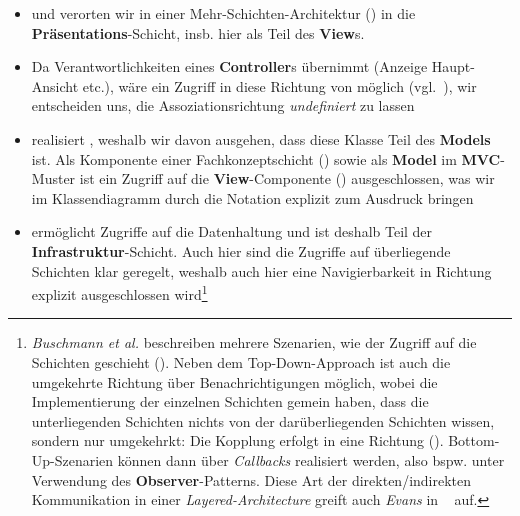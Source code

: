 \begin{itemize}
    \item {} und  verorten wir in einer Mehr-Schichten-Architektur (\cite[31 ff.]{BMRS96}) in die \textbf{Präsentations}-Schicht, insb. hier  als Teil des \textbf{View}s.
    \item[] Da  Verantwortlichkeiten eines \textbf{Controller}s übernimmt (Anzeige Haupt-Ansicht etc.), wäre ein Zugriff in diese Richtung von  möglich (vgl.~\cite[128]{BMRS96}), wir entscheiden uns, die Assoziationsrichtung \textit{undefiniert} zu lassen
    \item {} realisiert , weshalb wir davon ausgehen, dass diese Klasse Teil des \textbf{Models} ist.
    Als Komponente einer Fachkonzeptschicht (\cite[409 f.]{Bal05}) sowie als \textbf{Model} im \textbf{MVC}-Muster ist ein Zugriff auf die \textbf{View}-Componente () ausgeschlossen, was wir im Klassendiagramm durch die Notation explizit zum Ausdruck bringen
    \item {} ermöglicht Zugriffe auf die Datenhaltung und ist deshalb Teil der \textbf{Infrastruktur}-Schicht.
    Auch hier sind die Zugriffe auf überliegende Schichten klar geregelt, weshalb auch hier eine Navigierbarkeit in Richtung  explizit ausgeschlossen wird\footnote{
    \textit{Buschmann et al.} beschreiben mehrere Szenarien, wie der Zugriff auf die Schichten geschieht (\cite[36]{BMRS96}). Neben dem Top-Down-Approach ist   auch die umgekehrte Richtung über Benachrichtigungen möglich, wobei die Implementierung der einzelnen Schichten gemein haben, dass die unterliegenden Schichten nichts von der darüberliegenden Schichten wissen, sondern nur umgekehrkt: Die Kopplung erfolgt in eine Richtung  (\cite[41]{BMRS96}). Bottom-Up-Szenarien können dann über \textit{Callbacks} realisiert werden, also bspw. unter Verwendung des \textbf{Observer}-Patterns.
    Diese Art der direkten/indirekten Kommunikation in einer \textit{Layered-Architecture} greift auch \textit{Evans} in ~\cite[68]{Eva03} auf.
     }
\end{itemize}
